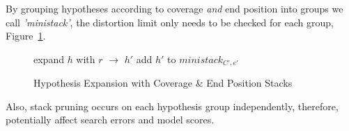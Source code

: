 \documentclass[11pt]{article}
\begin{document}
By grouping hypotheses according to coverage \emph{and} end position into groups we call \emph{'ministack'}, the distortion limit only needs to be checked for each group, Figure~\ref{algo:Hypothesis Expansion with Sorted Stack}. 
\begin{figure} [h]
\begin{algorithmic}
	\STATE expand $h$ with $r$ $\rightarrow$ $h'$
	\STATE add $h'$ to $ministack_{C',e'}$
      \ENDFOR
    \ENDIF
  \ENDFOR %
\ENDFOR %
\end{algorithmic}
\caption{Hypothesis Expansion with Coverage \& End Position Stacks}
\label{algo:Hypothesis Expansion with Sorted Stack}
\end{figure}

Also, stack pruning occurs on each hypothesis group independently, therefore, potentially affect search errors and model scores. 
\end{document}
